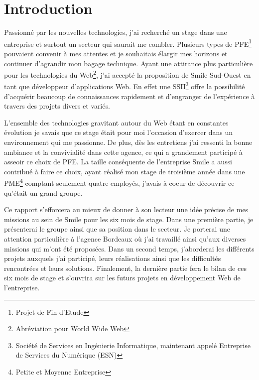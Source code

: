 \documentclass[a4paper,11pt,twoside]{report}
\begin{document}
\sffamily

\clearpage

\chapter*{Introduction}
\thispagestyle{\chead{ }}
Passionné  par les nouvelles technologies, j'ai recherché un stage dans une entreprise et surtout un secteur qui saurait me combler. Plusieurs types de PFE\footnote{Projet de Fin d'Etude} pouvaient convenir à mes attentes et je souhaitais élargir mes horizons et continuer d'agrandir mon bagage technique. Ayant une attirance plus particulière pour les technologies du Web\footnote{Abréviation pour World Wide Web}, j'ai accepté la proposition de Smile Sud-Ouest en tant que développeur d'applications Web. En effet une SSII\footnote{Société de Services en Ingénierie Informatique, maintenant appelé Entreprise de Services du Numérique (ESN)} offre la possibilité d'acquérir beaucoup de connaissances rapidement et d'engranger de l'expérience à travers des projets divers et variés.\newline

L'ensemble des technologies gravitant autour du Web étant en constantes évolution je savais que ce stage était pour moi l'occasion d'exercer dans un environnement qui me passionne. De plus, dès les entretiens j'ai ressenti la bonne ambiance et la convivialité dans cette agence, ce qui a grandement participé à asseoir ce choix de PFE. La taille conséquente de l'entreprise Smile a aussi contribué à faire ce choix, ayant réalisé mon stage de troisième année dans une PME\footnote{Petite et Moyenne Entreprise} comptant seulement quatre employés, j'avais à coeur de découvrir ce qu'était un grand groupe.\newline 

Ce rapport s’efforcera au mieux de donner à son lecteur une idée précise de mes missions au sein de Smile pour les six mois de stage. Dans une première partie, je présenterai le groupe ainsi que sa position dans le secteur. Je porterai une attention particulière à l'agence Bordeaux où j'ai travaillé ainsi qu'aux diverses missions qui m'ont été proposées. Dans un second temps, j’aborderai les différents projets auxquels j'ai participé, leurs réalisations ainsi que les difficultés rencontrées et leurs solutions. Finalement, la dernière partie fera le bilan de ces six mois de stage et s'ouvrira sur les futurs projets en développement Web de l’entreprise.
\end{document}
